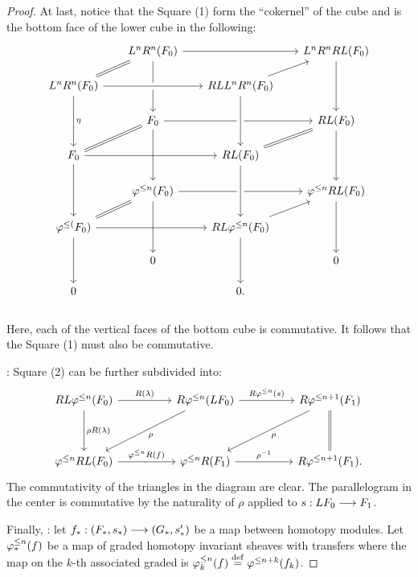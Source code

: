 \begin{proof}
At last, notice that the Square (1) form the ``cokernel'' of the
cube and is the bottom face of the lower cube in the following:
\[
\begin{tikzcd}[row sep=scriptsize, column sep=scriptsize]
& L^nR^n(F_0) \arrow[equals]{dl}\arrow{rr}\arrow{dd}{\eta} & & 
   L^nR^nRL(F_0) \arrow{dd} \\
L^nR^n(F_0) \arrow[crossing over]{rr}\arrow{dd}{\eta} & & 
   RLL^nR^n(F_0) \arrow{ur} \\
& F_0 \arrow[equals]{dl}\arrow{rr} \arrow{dd} & & RL(F_0) \arrow{dd}
   \arrow[equals]{dl} \\
F_0 \arrow{rr} \arrow{dd} & & 
   RL(F_0) \arrow[crossing over, leftarrow]{uu} \\
& \tlHI{n}(F_0) \arrow[equals]{dl}\arrow{rr} \arrow{dd} & & 
   \tlHI{n} RL(F_0) \arrow[leftarrow]{dl} \arrow{dd}\\
\tlHI(F_0) \arrow{rr} \arrow{dd} & & 
   RL\tlHI{n}(F_0) \arrow[crossing over, leftarrow]{uu} \\
& 0 & & 0 \\ 0 & & 0. \arrow[crossing over, leftarrow]{uu} \\
\end{tikzcd}
\]
Here, each of the vertical faces of the bottom cube is commutative.
It follows that the Square (1) must also be commutative.

 : Square (2) can be further 
subdivided into:
\[
\begin{tikzcd}[row sep=huge, column sep=huge]
RL\tlHI{n}(F_0) \arrow{r}{R(\lambda)} \arrow{d}{\rho R(\lambda)} &
R\tlHI{n}(LF_0) \arrow{ld}{\rho} \arrow{r}{R\tlHI{n}(\susp)} &
R\tlHI{n + 1}(F_1) \arrow{ld}{\rho} \arrow[equals]{d} \\
\tlHI{n} RL(F_0) \arrow{r}{\tlHI{n} R(f)} &
\tlHI{n} R(F_1) \arrow{r}{\rho^{-1}} &
R\tlHI{n + 1}(F_1).
\end{tikzcd}
\]
The commutativity of the triangles in the diagram are clear. The 
parallelogram in the center is commutative by the naturality of
$\rho$ applied to $\susp: LF_0 \to F_1$.

Finally, 
 : let $f_*: (F_*,\susp_*) \to 
(G_*, \susp_*')$ be a map between homotopy modules. Let 
$\tlHM{n}(f)$ be a map of graded homotopy invariant sheaves with 
transfers where the map on the $k$-th associated graded is 
$\tlHM[k]{n}(f) \defeq \tlHI{n + k}(f_k)$. 


\end{proof}
